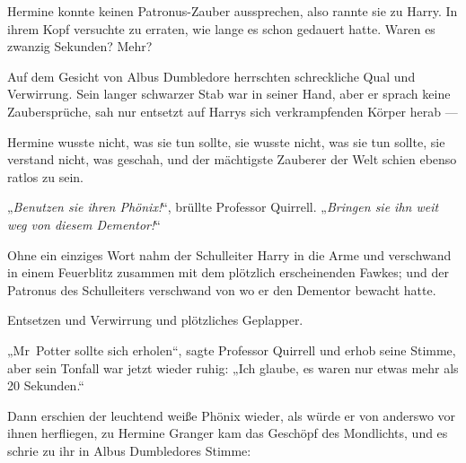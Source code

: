 Hermine konnte keinen Patronus-Zauber aussprechen, also rannte sie zu Harry. In ihrem Kopf versuchte zu erraten, wie lange es schon gedauert hatte. Waren es zwanzig Sekunden? Mehr?

Auf dem Gesicht von Albus Dumbledore herrschten schreckliche Qual und Verwirrung. Sein langer schwarzer Stab war in seiner Hand, aber er sprach keine Zaubersprüche, sah nur entsetzt auf Harrys sich verkrampfenden Körper herab —

Hermine wusste nicht, was sie tun sollte, sie wusste nicht, was sie tun sollte, sie verstand nicht, was geschah, und der mächtigste Zauberer der Welt schien ebenso ratlos zu sein.

„\emph{Benutzen sie ihren Phönix!}“, brüllte Professor Quirrell.
„\emph{Bringen sie ihn weit weg von diesem Dementor!}“

Ohne ein einziges Wort nahm der Schulleiter Harry in die Arme und verschwand in einem Feuerblitz zusammen mit dem plötzlich erscheinenden Fawkes; und der Patronus des Schulleiters verschwand von wo er den Dementor bewacht hatte.

Entsetzen und Verwirrung und plötzliches Geplapper.

„Mr~Potter sollte sich erholen“, sagte Professor Quirrell und erhob seine Stimme, aber sein Tonfall war jetzt wieder ruhig:
„Ich glaube, es waren nur etwas mehr als 20 Sekunden.“

Dann erschien der leuchtend weiße Phönix wieder, als würde er von anderswo vor ihnen herfliegen, zu Hermine Granger kam das Geschöpf des Mondlichts, und es schrie zu ihr in Albus Dumbledores Stimme:

